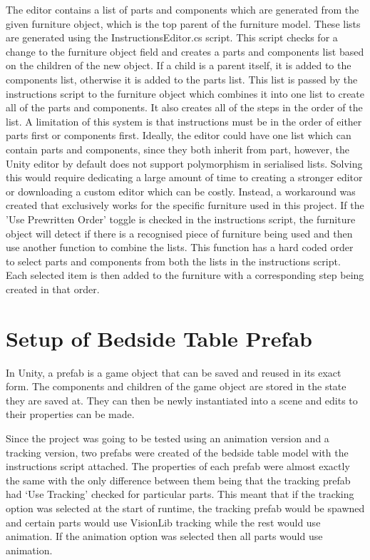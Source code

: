 \documentclass{l4proj}
\begin{document}
The editor contains a list of parts and components which are generated from the given furniture object, which is the top parent of the furniture model. These lists are generated using the InstructionsEditor.cs script. This script checks for a change to the furniture object field and creates a parts and components list based on the children of the new object. If a child is a parent itself, it is added to the components list, otherwise it is added to the parts list. This list is passed by the instructions script to the furniture object which combines it into one list to create all of the parts and components. It also creates all of the steps in the order of the list. A limitation of this system is that instructions must be in the order of either parts first or components first. Ideally, the editor could have one list which can contain parts and components, since they both inherit from part, however, the Unity editor by default does not support polymorphism in serialised lists. Solving this would require dedicating a large amount of time to creating a stronger editor or downloading a custom editor which can be costly. Instead, a workaround was created that exclusively works for the specific furniture used in this project. If the 'Use Prewritten Order' toggle is checked in the instructions script, the furniture object will detect if there is a recognised piece of furniture being used and then use another function to combine the lists. This function has a hard coded order to select parts and components from both the lists in the instructions script. Each selected item is then added to the furniture with a corresponding step being created in that order.

\section{Setup of Bedside Table Prefab}

In Unity, a prefab is a game object that can be saved and reused in its exact form. The components and children of the game object are stored in the state they are saved at. They can then be newly instantiated into a scene and edits to their properties can be made.

Since the project was going to be tested using an animation version and a tracking version, two prefabs were created of the bedside table model with the instructions script attached. The properties of each prefab were almost exactly the same with the only difference between them being that the tracking prefab had `Use Tracking' checked for particular parts. This meant that if the tracking option was selected at the start of runtime, the tracking prefab would be spawned and certain parts would use VisionLib tracking while the rest would use animation. If the animation option was selected then all parts would use animation.
\end{document}
